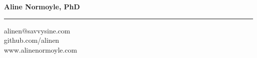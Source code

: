 {\Large {\bf Aline Normoyle, PhD}}
\hrule
alinen$@$savvysine.com\\
github.com/alinen\\
\textcolor{Periwinkle}{www.alinenormoyle.com}


